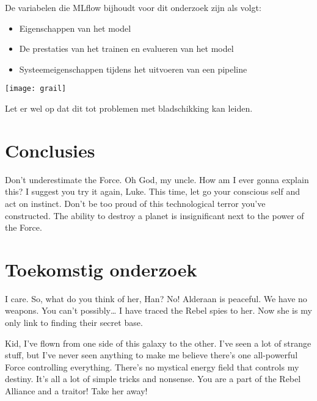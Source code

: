 \documentclass[a0,portrait]{hogent-poster}
\begin{document}
\begin{multicols}{2}
De variabelen die MLflow bijhoudt voor dit onderzoek zijn als volgt:
\begin{itemize}
  \item Eigenschappen van het model
  \item De prestaties van het trainen en evalueren van het model
  \item Systeemeigenschappen tijdens het uitvoeren van een pipeline
\end{itemize}

\begin{center}
  \captionsetup{type=figure}
  \texttt{[image: grail]}
\end{center}

Let er wel op dat dit tot problemen met bladschikking kan leiden.

\section{Conclusies}

Don't underestimate the Force. Oh God, my uncle. How am I ever gonna explain this? I suggest you try it again, Luke. This time, let go your conscious self and act on instinct. Don't be too proud of this technological terror you've constructed. The ability to destroy a planet is insignificant next to the power of the Force.

\section{Toekomstig onderzoek}

I care. So, what do you think of her, Han? No! Alderaan is peaceful. We have no weapons. You can't possibly… I have traced the Rebel spies to her. Now she is my only link to finding their secret base.

Kid, I've flown from one side of this galaxy to the other. I've seen a lot of strange stuff, but I've never seen anything to make me believe there's one all-powerful Force controlling everything. There's no mystical energy field that controls my destiny. It's all a lot of simple tricks and nonsense. You are a part of the Rebel Alliance and a traitor! Take her away! 

\end{multicols}
\end{document}
